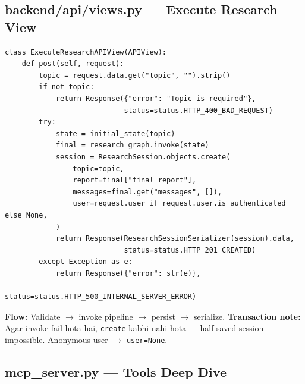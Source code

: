 \subsection{backend/api/views.py --- Execute Research View}

\begin{codestorybox}
\begin{lstlisting}[style=pythonstyle, caption={ExecuteResearchAPIView}]
class ExecuteResearchAPIView(APIView):
    def post(self, request):
        topic = request.data.get("topic", "").strip()
        if not topic:
            return Response({"error": "Topic is required"},
                            status=status.HTTP_400_BAD_REQUEST)
        try:
            state = initial_state(topic)
            final = research_graph.invoke(state)
            session = ResearchSession.objects.create(
                topic=topic,
                report=final["final_report"],
                messages=final.get("messages", []),
                user=request.user if request.user.is_authenticated else None,
            )
            return Response(ResearchSessionSerializer(session).data,
                            status=status.HTTP_201_CREATED)
        except Exception as e:
            return Response({"error": str(e)},
                            status=status.HTTP_500_INTERNAL_SERVER_ERROR)
\end{lstlisting}

\textbf{Flow:} Validate $\rightarrow$ invoke pipeline $\rightarrow$ persist $\rightarrow$ serialize. \textbf{Transaction note:} Agar invoke fail hota hai, \texttt{create} kabhi nahi hota --- half-saved session impossible. Anonymous user $\rightarrow$ \texttt{user=None}.
\end{codestorybox}

\subsection{mcp\_server.py --- Tools Deep Dive}

